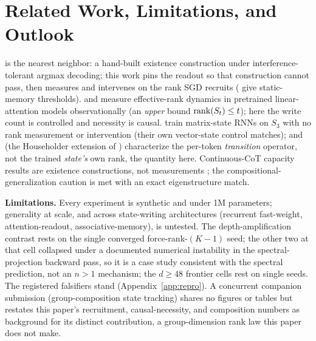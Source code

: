 \section{Related Work, Limitations, and Outlook}
\label{sec:related}

\citet{nichani2025factual} is the nearest neighbor: a hand-built
existence construction under interference-tolerant argmax decoding;
this work pins the readout so that construction cannot pass, then
measures and intervenes on the rank SGD recruits
(\citealp{barnfield2026sharp} give static-memory thresholds).
\citet{nazari2026rank} and \citet{sun2026staterank} measure
effective-rank dynamics in pretrained linear-attention models
observationally (an \emph{upper} bound $\operatorname{rank}(S_t) \leq t$); here the
write count is controlled and necessity is causal. \citet{mishra2026m2rnn} train matrix-state RNNs on $S_3$ with no rank
measurement or intervention (their own vector-state control matches);
\citet{grazzi2025negative} and \citet{siems2025deltaproduct} (the
Householder extension of \citealp{yang2024deltanet}) characterize the
per-token \emph{transition} operator, not the trained \emph{state's}
own rank, the quantity here. Continuous-CoT capacity
results are existence constructions, not measurements
\citep{zhu2025superposition,gozeten2025cot2}; the
compositional-generalization caution
\citep{dziri2023faithfate,wang2024grokked} is met with an exact
eigenstructure match.

\textbf{Limitations.} Every experiment is synthetic and under 1M
parameters; generality at scale, and across state-writing architectures
(recurrent fast-weight, attention-readout, associative-memory), is
untested.
The depth-amplification contrast rests on the single converged
force-rank-$(K{-}1)$ seed; the other two at that cell collapsed under
a documented numerical instability in the spectral-projection backward
pass, so it is a case study consistent with the spectral prediction,
not an $n{>}1$ mechanism; the $d \geq 48$ frontier cells rest on
single seeds. The registered falsifiers stand
(Appendix~\ref{app:repro}). A concurrent companion submission
(group-composition state tracking) shares no figures or tables but
restates this paper's recruitment, causal-necessity, and composition
numbers as background for its distinct contribution, a group-dimension
rank law this paper does not make.
